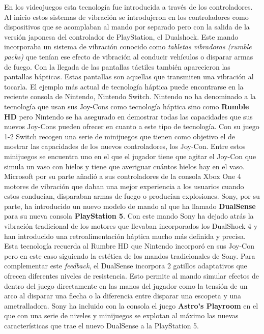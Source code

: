 En los videojuegos esta tecnolog\'ia fue introducida a trav\'es de los controladores. Al inicio estos sistemas de vibraci\'on se introdujeron en los controladores como dispositivos que se acomplaban al mando por separado pero con la salida de la versi\'on japonesa del controlador de PlayStation, el Dualshock. Este mando incorporaba un sistema de vibraci\'on conocido como \textit{tabletas vibradoras (rumble packs)} que ten\'ian ese efecto de vibraci\'on al conducir veh\'iculos o disparar armas de fuego. Con la llegada de las pantallas t\'actiles tambi\'en aparecieron las pantallas h\'apticas. Estas pantallas son aquellas que transmiten una vibraci\'on al tocarla. El ejemplo m\'as actual de tecnolog\'ia h\'aptica puede encontrarse en la reciente consola de Nintendo, Nintendo Switch. Nintendo no ha denominado a la tecnolog\'ia que usan sus Joy-Cons como tecnolog\'ia h\'aptica sino como \textbf{Rumble HD} pero Nintendo se ha asegurado en demostrar todas las capacidades que sus nuevos Joy-Cons pueden ofrecer en cuanto a este tipo de tecnolog\'ia. Con su juego 1-2 Switch recogen una serie de minijuegos que tienen como objetivo el de mostrar las capacidades de los nuevos controladores, los Joy-Con. Entre estos minijuegos se encuentra uno en el que el jugador tiene que agitar el Joy-Con que simula un vaso con hielos y tiene que averiguar cu\'antos hielos hay en el vaso. Microsoft por su parte a\~nadi\'o a sus controladores de la consola Xbox One 4 motores de vibraci\'on que daban una mejor experiencia a los usuarios cuando estos conduc\'ian, disparaban armas de fuego o produc\'ian explosiones. Sony, por su parte, ha introducido un nuevo modelo de mando al que ha llamado \textbf{DualSense} para su nueva consola \textbf{PlayStation 5}. Con este mando Sony ha dejado atr\'as la vibraci\'on tradicional de los motores que llevaban incorporados los DualShock 4 y han introducido una retroalimentaci\'on h\'aptica mucho m\'as definida y precisa. Esta tecnolog\'ia recuerda al Rumbre HD que Nintendo incorpor\'o en sus Joy-Con pero en este caso siguiendo la est\'etica de los mandos tradicionales de Sony. Para complementar este \textit{feedback}, el DualSense incorpora 2 gatillos adaptativos que ofrecen diferentes niveles de resistencia. Esto permite al mando simular efectos de dentro del juego directamente en las manos del jugador como la tensi\'on de un arco al disparar una flecha o la diferencia entre disparar una escopeta y una ametralladora. Sony ha incluido con la consola el juego \textbf{Astro's Playroom} en el que con una serie de niveles y minijuegos se explotan al m\'aximo las nuevas caracter\'isticas que trae el nuevo DualSense a la PlayStation 5.


